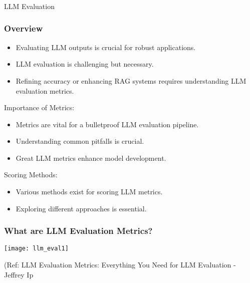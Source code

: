 \begin{frame}[fragile]\frametitle{}
\begin{center}
{\Large LLM Evaluation}
\end{center}
\end{frame}

\begin{frame}[fragile]\frametitle{Overview}
  \begin{itemize}
    \item Evaluating LLM outputs is crucial for robust applications.
    \item LLM evaluation is challenging but necessary.
    \item Refining accuracy or enhancing RAG systems requires understanding LLM evaluation metrics.
  \end{itemize}

Importance of Metrics:
  \begin{itemize}
    \item Metrics are vital for a bulletproof LLM evaluation pipeline.
    \item Understanding common pitfalls is crucial.
    \item Great LLM metrics enhance model development.
  \end{itemize}
  
Scoring Methods:
  \begin{itemize}
    \item Various methods exist for scoring LLM metrics.
    \item Exploring different approaches is essential.
  \end{itemize}
\end{frame}


\begin{frame}[fragile]\frametitle{What are LLM Evaluation Metrics?}


\begin{center}
\texttt{[image: llm\_eval1]}
\end{center}		
		
{\tiny (Ref: LLM Evaluation Metrics: Everything You Need for LLM Evaluation - Jeffrey Ip}
			
			
\end{frame}

